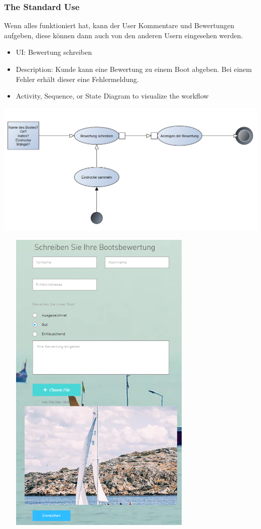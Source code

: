 \documentclass[12pt]{article}
\theoremstyle{definition}
\begin{document}
\subsubsection{The Standard Use}
Wenn alles funktioniert hat, kann der User Kommentare und Bewertungen aufgeben, diese können dann auch von den anderen Usern eingesehen werden.
\begin{itemize}
	\item UI: Bewertung schreiben
	\item Description: Kunde kann eine Bewertung zu einem Boot abgeben. Bei einem Fehler erhält dieser eine Fehlermeldung.
	\item Activity, Sequence, or State Diagram to visualize the workflow
\end{itemize}
\includegraphics[height=0.40\textwidth]{Bewertung_schreiben.PNG}
\begin{center}\includegraphics[width=10cm,height=15cm,keepaspectratio]{Bewertung_UI.PNG}\end{center}
\end{document}
